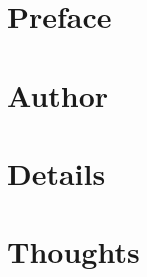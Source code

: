 \documentclass[12pt,a4paper]{article}
\title{}
\author{Yulong Wang}
\date{\today}
\begin{document}
\maketitle

\section*{Preface}



\section*{Author}



\section*{Details}



\section*{Thoughts}
\end{document}
